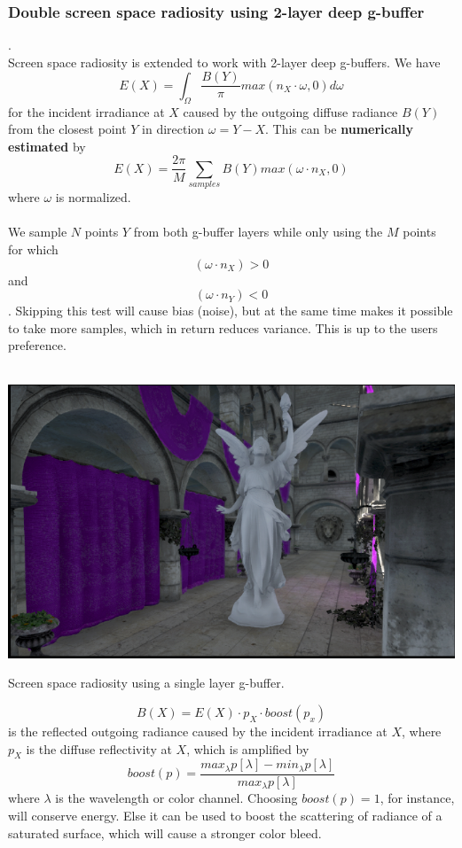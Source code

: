 \documentclass{ACGSeminar}
\begin{document}
	\subsubsection{Double screen space radiosity using 2-layer deep g-buffer}
		.\\
		Screen space radiosity \cite{RTAII} is extended to work with 2-layer deep g-buffers. We have 
		$$ E(X) = \int_{\Omega} \frac{B(Y)}{\pi} max(n_X \cdot \omega, 0) d\omega$$
		for the incident irradiance at $X$ caused by the outgoing diffuse radiance $B(Y)$ from the closest point $Y$ in direction $\omega = Y - X$. This can be \textbf{numerically estimated} by
		$$ E(X) = \frac{2\pi}{M} \sum_{samples} B(Y) max(\omega \cdot n_X, 0)$$
		where $\omega$ is normalized. \\\\
		We sample $N$ points $Y$ from both g-buffer layers while only using the $M$ points for which
		$$ (\omega \cdot n_X) > 0 $$
		and
		$$ (\omega \cdot n_Y) < 0 $$. Skipping this test will cause bias (noise), but at the same time makes it possible to take more samples, which in return reduces variance. This is up to the users preference. \\\\
		\begin{floatingfigure}[r]{.5\textwidth}%
			\includegraphics[width=.5\textwidth]{img/radiosity_one.png}
			\caption{Screen space radiosity using a single layer g-buffer.}%
			\label{fig:radiosity_one}%
		\end{floatingfigure}%
		$$ B(X) = E(X) \cdot p_X \cdot boost(p_x) $$
		is the reflected outgoing radiance caused by the incident irradiance at $X$, where $p_X$ is the diffuse reflectivity at $X$, which is amplified by 
		$$ boost(p) = \frac{max_{\lambda}p[\lambda] - min_{\lambda}p[\lambda]}{max_{\lambda}p[\lambda]} $$ 
		where $\lambda$ is the wavelength or color channel. Choosing $boost(p) = 1$, for instance, will conserve energy. Else it can be used to boost the scattering of radiance of a saturated surface, which will cause a stronger color bleed. \\\\
\end{document}
